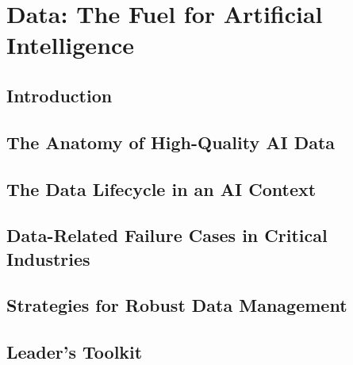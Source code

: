 \chapter{Data: The Fuel for Artificial Intelligence}
\label{chap:data_the_fuel_for_artificial_intelligence}

\section{Introduction}
\label{sec:data_introduction}

\section{The Anatomy of High-Quality AI Data}
\label{sec:anatomy_of_data}

\section{The Data Lifecycle in an AI Context}
\label{sec:data_lifecycle}

\section{Data-Related Failure Cases in Critical Industries}
\label{sec:data_failure_cases}

\section{Strategies for Robust Data Management}
\label{sec:data_management_strategies}

\section{Leader's Toolkit}
\label{sec:data_leaders_toolkit}